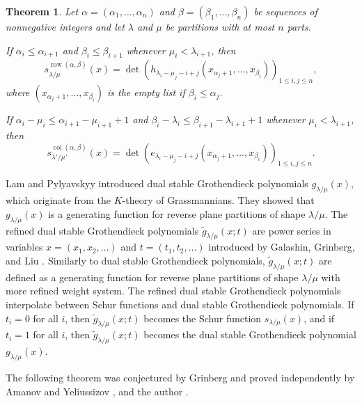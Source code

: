 \documentclass[12pt]{amsart}
\numberwithin{equation}{section}
\newtheorem{thm}{Theorem}[section]
\theoremstyle{definition}
\newcommand\wg{\widetilde{g}}
\newcommand\col{\operatorname{col}}
\newcommand\row{\operatorname{row}}
\newcommand\lm{{\lambda/\mu}}
\begin{document}
\begin{thm}\cite[Theorems~3.5 and 3.5*]{Wachs_1985}
\label{thm:wachs}
Let $\alpha=(\alpha_1,\dots,\alpha_n)$ and $\beta=(\beta_1,\dots,\beta_n)$ be
sequences of nonnegative integers and let $\lambda$ and $\mu$ be partitions with
at most $n$ parts.

If $\alpha_i\le \alpha_{i+1}$ and $\beta_i\le \beta_{i+1}$ whenever
$\mu_i<\lambda_{i+1}$, then
\begin{equation}
  \label{eq:wachs1}
s_{\lambda/\mu}^{\row(\alpha,\beta)}(x)  = \det \left(
    h_{\lambda_i-\mu_j-i+j}(x_{\alpha_j+1},\dots, x_{\beta_i})
  \right)_{1\le i,j\le n},
\end{equation}
where $(x_{\alpha_j+1},\dots, x_{\beta_i})$ is the empty list if $\beta_i \leq
\alpha_j$.

If $\alpha_i-\mu_i\le \alpha_{i+1}-\mu_{i+1}+1$ and $\beta_i-\lambda_i\le
\beta_{i+1}-\lambda_{i+1}+1$ whenever $\mu_i<\lambda_{i+1}$, then
\begin{equation}
 \label{eq:wachs2}
s_{\lambda'/\mu'}^{\col(\alpha,\beta)}(x)  = \det \left(
    e_{\lambda_i-\mu_j-i+j}(x_{\alpha_j+1},\dots, x_{\beta_i})
  \right)_{1\le i,j\le n}.
\end{equation}
\end{thm}



Lam and Pylyavskyy \cite{LP2007} introduced dual stable Grothendieck polynomials
$g_{\lm}(x)$, which originate from the $K$-theory of Grassmannians. They showed
that $g_{\lm}(x)$ is a generating function for reverse plane partitions of shape
$\lm$. The refined dual stable Grothendieck polynomials $\wg_{\lm}(x;t)$ are
power series in variables $x=(x_1,x_2,\dots)$ and $t=(t_1,t_2,\dots)$ introduced
by Galashin, Grinberg, and Liu \cite{GGL2016}. Similarly to dual stable
Grothendieck polynomials, $\wg_{\lm}(x;t)$ are defined as a generating function
for reverse plane partitions of shape $\lm$ with more refined weight system. The
refined dual stable Grothendieck polynomials interpolate between Schur functions
and dual stable Grothendieck polynomials. If $t_i=0$ for all $i$, then
$\wg_{\lm}(x;t)$ becomes the Schur function $s_{\lm}(x)$, and if $t_i=1$ for all
$i$, then $\wg_{\lm}(x;t)$ becomes the dual stable Grothendieck polynomial
$g_{\lm}(x)$.

The following theorem was conjectured by Grinberg \cite{Grinberg_conj} and
proved independently by Amanov and Yeliussizov \cite{AmanovYeliussizov}, and the
author \cite{Kim:JT}.
\end{document}

